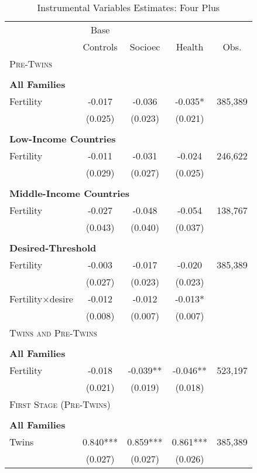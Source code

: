 \begin{table}[!htbp] \centering 
\caption{Instrumental Variables Estimates: Four Plus} 
\label{TWINtab:IVFourplus} 
\begin{tabular}{lcccc} \toprule \toprule 
&Base&&&\\
&Controls&Socioec&Health&Obs.\\\midrule
\multicolumn{5}{l}{\textsc{Pre-Twins}}\\ 
&&&&\\
\multicolumn{5}{l}{\textbf{All Families}}\\ 
Fertility&-0.017&-0.036&-0.035*&385,389\\
         &(0.025)&(0.023)&(0.021)&\\
&&&&\\
\multicolumn{5}{l}{\textbf{Low-Income Countries}}\\ 
Fertility&-0.011&-0.031&-0.024&246,622\\
         &(0.029)&(0.027)&(0.025)&\\
&&&&\\
\multicolumn{5}{l}{\textbf{Middle-Income Countries}}\\ 
Fertility&-0.027&-0.048&-0.054&138,767\\
         &(0.043)&(0.040)&(0.037)&\\
&&&&\\
\multicolumn{5}{l}{\textbf{Desired-Threshold}}\\ 
Fertility&-0.003&-0.017&-0.020&385,389\\
         &(0.027)&(0.023)&(0.023)&\\
Fertility$\times$desire&-0.012&-0.012&-0.013*&\\
         &(0.008)&(0.007)&(0.007)&\\
\midrule\multicolumn{5}{l}{\textsc{Twins and Pre-Twins}}\\ 
&&&&\\
\multicolumn{5}{l}{\textbf{All Families}}\\ 
Fertility&-0.018&-0.039**&-0.046**&523,197\\
         &(0.021)&(0.019)&(0.018)&\\
\midrule\multicolumn{5}{l}{\textsc{First Stage (Pre-Twins)}}\\ 
&&&&\\
\multicolumn{5}{l}{\textbf{All Families}}\\ 
Twins&0.840***&0.859***&0.861***&385,389\\
         &(0.027)&(0.027)&(0.026)&\\

\end{tabular}
\end{table}
